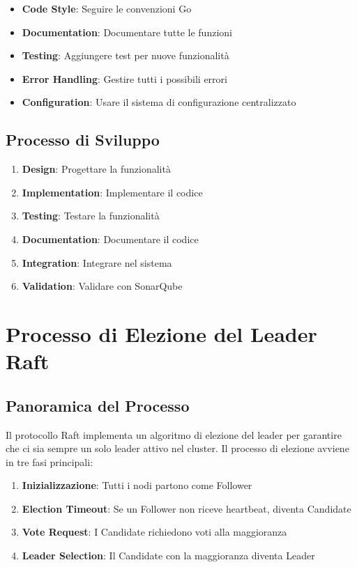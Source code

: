 \documentclass[12pt,a4paper]{article}
\begin{document}
\begin{itemize}
\item \textbf{Code Style}: Seguire le convenzioni Go
\item \textbf{Documentation}: Documentare tutte le funzioni
\item \textbf{Testing}: Aggiungere test per nuove funzionalità
\item \textbf{Error Handling}: Gestire tutti i possibili errori
\item \textbf{Configuration}: Usare il sistema di configurazione centralizzato
\end{itemize}

\subsection{Processo di Sviluppo}

\begin{enumerate}
\item \textbf{Design}: Progettare la funzionalità
\item \textbf{Implementation}: Implementare il codice
\item \textbf{Testing}: Testare la funzionalità
\item \textbf{Documentation}: Documentare il codice
\item \textbf{Integration}: Integrare nel sistema
\item \textbf{Validation}: Validare con SonarQube
\end{enumerate}

\section{Processo di Elezione del Leader Raft}

\subsection{Panoramica del Processo}

Il protocollo Raft implementa un algoritmo di elezione del leader per garantire che ci sia sempre un solo leader attivo nel cluster. Il processo di elezione avviene in tre fasi principali:

\begin{enumerate}
\item \textbf{Inizializzazione}: Tutti i nodi partono come Follower
\item \textbf{Election Timeout}: Se un Follower non riceve heartbeat, diventa Candidate
\item \textbf{Vote Request}: I Candidate richiedono voti alla maggioranza
\item \textbf{Leader Selection}: Il Candidate con la maggioranza diventa Leader
\end{enumerate}
\end{document}
